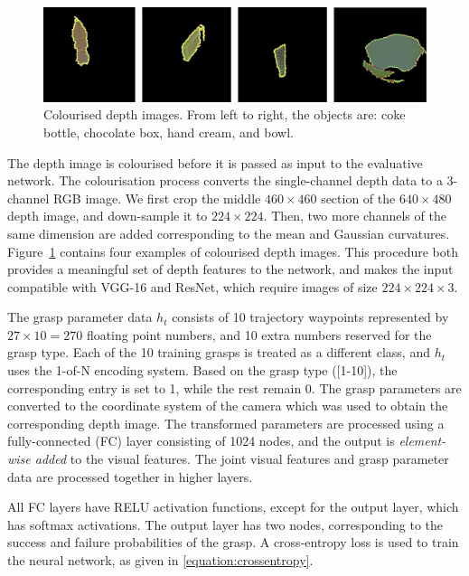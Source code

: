\begin{figure}[h]
  \includegraphics[width=0.9\linewidth]{images/colourDepth.pdf}
  \caption[Colourised depth images.]{Colourised depth images. From left to right, the objects are: coke bottle, chocolate box, hand cream, and bowl.}
\label{fig:colorisedDepth}
\end{figure}

The depth image is colourised before it is passed as input to the evaluative network. The colourisation process converts the single-channel depth data to a 3-channel RGB image. We first crop the middle $460 \times 460$ section of the $640 \times 480$ depth image, and down-sample it to $224 \times 224$. Then, two more channels of the same dimension are added corresponding to the mean and Gaussian curvatures. Figure~\ref{fig:colorisedDepth} contains four examples of colourised depth images. This procedure both provides a meaningful set of depth features to the network, and makes the input compatible with VGG-16 and ResNet, which require images of size $224 \times 224 \times 3$.

The grasp parameter data $h_t$ consists of 10 trajectory waypoints represented by $27 \times 10 = 270$ floating point numbers, and 10 extra numbers reserved for the grasp type. Each of the 10 training grasps is treated as a different class, and $h_t$ uses the 1-of-N encoding system. Based on the grasp type ([1-10]), the corresponding entry is set to 1, while the rest remain 0. The grasp parameters are converted to the coordinate system of the camera which was used to obtain the corresponding depth image. The transformed parameters are processed using a fully-connected (FC) layer consisting of 1024 nodes, and the output is \textit{element-wise added} to the visual features. The joint visual features and grasp parameter data are processed together in higher layers.

All FC layers have RELU activation functions, except for the output layer, which has softmax activations. The output layer has two nodes, corresponding to the success and failure probabilities of the grasp. A cross-entropy loss is used to train the neural network, as given in \eq\ref{equation:crossentropy}.

